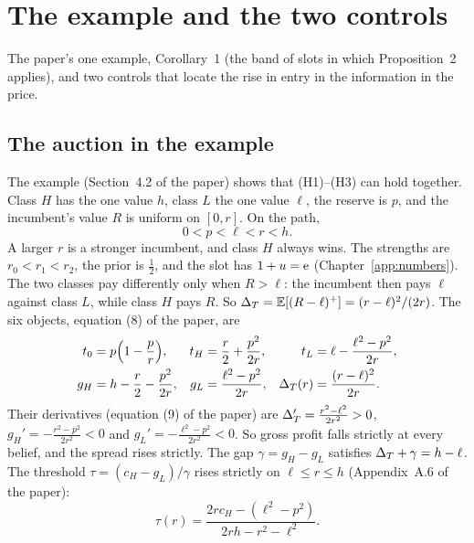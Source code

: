 \chapter{The example and the two controls}\label{ch:example}

\begin{chapterplan}
The paper's one example, Corollary~1 (the band of slots in which Proposition~2 applies), and two controls that
locate the rise in entry in the information in the price.
\end{chapterplan}

\section{The auction in the example}\label{sec:example-auction}

The example (Section~4.2 of the paper) shows that (H1)--(H3) can hold together. Class \(H\) has the one value \(h\), class \(L\) the one value \(\ell\), the reserve is \(p\), and the incumbent's value \(R\) is uniform
on \([0,r]\). On the path,
\begin{equation}\label{eq:example-order}
0<p<\ell<r<h.
\end{equation}
A larger \(r\) is a stronger incumbent, and class \(H\) always wins. The strengths are \(r_0<r_1<r_2\), the prior is
\(\tfrac12\), and the slot has \(1+u=\mathrm{e}\) (Chapter~\ref{app:numbers}). The two classes pay differently only when
\(R>\ell\): the incumbent then pays \(\ell\) against class \(L\), while class \(H\) pays \(R\). So
\(\Delta_T=\mathbb{E}[(R-\ell)^+]=(r-\ell)^2/(2r)\). The six objects, equation (8) of the paper, are
\begin{equation}\label{eq:example-payoffs}
\begin{aligned}
t_0&=p\Bigl(1-\frac pr\Bigr),& t_H&=\frac r2+\frac{p^2}{2r},& t_L&=\ell-\frac{\ell^2-p^2}{2r},\\
g_H&=h-\frac r2-\frac{p^2}{2r},& g_L&=\frac{\ell^2-p^2}{2r},& \Delta_T(r)&=\frac{(r-\ell)^2}{2r}.
\end{aligned}
\end{equation}
Their derivatives (equation (9) of the paper) are
\(\Delta_T'=\frac{r^2-\ell^2}{2r^2}>0\), \(g_H'=-\frac{r^2-p^2}{2r^2}<0\) and \(g_L'=-\frac{\ell^2-p^2}{2r^2}<0\). So
gross profit falls strictly at every belief, and the spread rises strictly. The gap \(\gamma=g_H-g_L\) satisfies
\(\Delta_T+\gamma=h-\ell\). The threshold \(\tau=(c_H-g_L)/\gamma\) rises strictly on \(\ell\le r\le h\) (Appendix~A.6 of
the paper):
\begin{equation}\label{eq:example-tau}
\tau(r)=\frac{2rc_H-(\ell^2-p^2)}{2rh-r^2-\ell^2}.
\end{equation}

